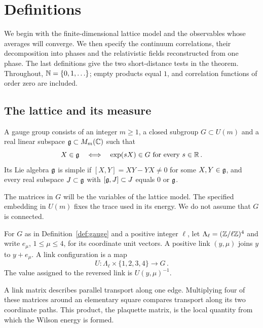 \clearpage
\section{Definitions}\label{sec:definitions}

We begin with the finite-dimensional lattice model and the observables whose averages will converge.
We then specify the continuum correlations, their decomposition into phases and the relativistic fields reconstructed from one phase.
The last definitions give the two short-distance tests in the theorem.
Throughout, $\mathbb N=\{0,1,\ldots\}$; empty products equal $1$, and correlation functions of order zero are included.

\subsection{The lattice and its measure}\label{subsec:lattice-family}

\begin{definition}\label{def:gauge}
A gauge group consists of an integer $m\ge1$, a closed subgroup $G\subset U(m)$ and a real linear subspace $\mathfrak g\subset M_m(\mathbb C)$ such that
\begin{equation}\label{eq:gauge}
X\in\mathfrak g\quad\Longleftrightarrow\quad \exp(sX)\in G\text{ for every }s\in\mathbb R\,.
\end{equation}
Its Lie algebra $\mathfrak g$ is simple if $[X,Y]=XY-YX\ne0$ for some $X,Y\in\mathfrak g$, and every real subspace $J\subset\mathfrak g$ with $[\mathfrak g,J]\subset J$ equals $0$ or $\mathfrak g$.
\end{definition}

The matrices in $G$ will be the variables of the lattice model.
The specified embedding in $U(m)$ fixes the trace used in its energy.
We do not assume that $G$ is connected.

\begin{definition}\label{def:lattice}
For $G$ as in Definition~\ref{def:gauge} and a positive integer $\ell$, let $\Lambda_\ell=(\mathbb Z/\ell\mathbb Z)^4$ and write $e_\mu$, $1\le\mu\le4$, for its coordinate unit vectors.
A positive link $(y,\mu)$ joins $y$ to $y+e_\mu$.
A link configuration is a map
\begin{equation}\label{eq:link-configuration}
U:\Lambda_\ell\times\{1,2,3,4\}\longrightarrow G\,.
\end{equation}
The value assigned to the reversed link is $U(y,\mu)^{-1}$.
\end{definition}

A link matrix describes parallel transport along one edge.
Multiplying four of these matrices around an elementary square compares transport along its two coordinate paths.
This product, the plaquette matrix, is the local quantity from which the Wilson energy is formed.

